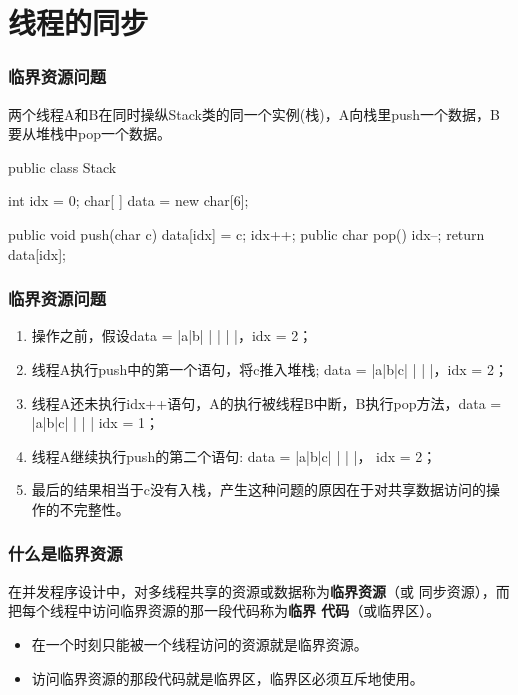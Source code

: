 
\section{线程的同步}

\begin{frame}[fragile] %
\frametitle{临界资源问题}

两个线程A和B在同时操纵Stack类的同一个实例(栈)，A向栈里push一个数据，B要从堆栈中pop一个数据。


\begin{javaCode}
public class Stack {
  int idx = 0;
  char[ ] data = new char[6];
  
  public void push(char c) {
    data[idx] = c;
    idx++;
  }
  public char pop() {
    idx--;
    return data[idx];
  }
}
\end{javaCode}
\end{frame}

\begin{frame}[fragile] %
\frametitle{临界资源问题}

\begin{enumerate}[<+-| alert@+>]\kai
\item 操作之前，假设data = |a|b| | | | |，idx = 2；
\item 线程A执行push中的第一个语句，将c推入堆栈; data = |a|b|c| | | |，idx = 2；
\item 线程A还未执行idx++语句，A的执行被线程B中断，B执行pop方法，data = |a|b|c| | | | idx = 1；
\item 线程A继续执行push的第二个语句: data = |a|b|c| | | |， idx = 2；
\item 最后的结果相当于c没有入栈，产生这种问题的原因在于对共享数据访问的操作的不完整性。
\end{enumerate}
\end{frame}

\begin{frame}[fragile]
  \frametitle{什么是临界资源}

  在并发程序设计中，对多线程共享的资源或数据称为{\bf\Red 临界资源}（或
  同步资源），而把每个线程中访问临界资源的那一段代码称为{\bf\Blue 临界
    代码}（或临界区）。

  \begin{itemize}
  \item 在一个时刻只能被一个线程访问的资源就是临界资源。
  \item 访问临界资源的那段代码就是临界区，{\kai\Red 临界区必须互斥地使用}。
  \end{itemize}

\end{frame}


